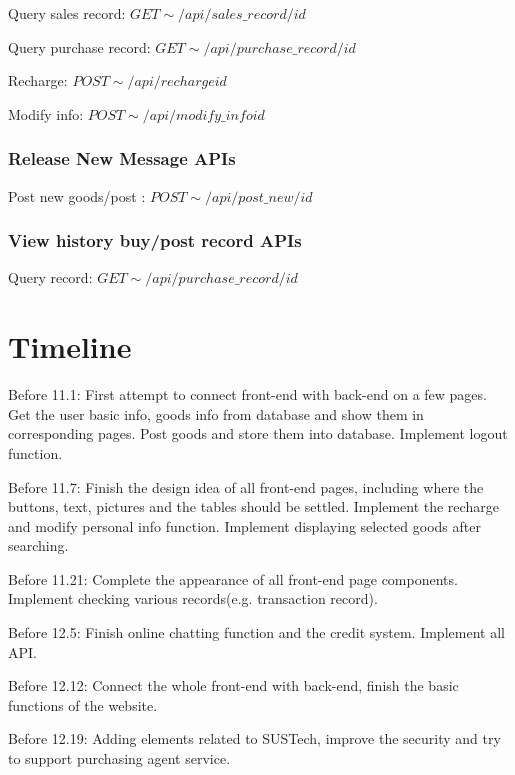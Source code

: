 \documentclass[12pt]{article}  %
\begin{document}
Query sales record: $GET\sim/api/sales\_record/{id}$

Query purchase record: $GET\sim/api/purchase\_record/{id}$

Recharge: $POST\sim/api/recharge{id}$

Modify info: $POST\sim/api/modify\_info{id}$

\vspace{-10pt}

\subsubsection*{Release New Message APIs}
Post new goods/post : $POST\sim/api/post\_new/{id}$

\vspace{-10pt}

\subsubsection*{View history buy/post record APIs}
Query record: $GET\sim/api/purchase\_record/{id}$


\section{Timeline}

Before 11.1: 
First attempt to connect front-end with 
back-end on a few pages. Get the user basic info, goods 
info from database and show them in corresponding pages. 
Post goods and store them into database. Implement 
logout function.

Before 11.7: 
Finish the design idea of all front-end pages, including 
where the buttons, text, pictures and the tables should 
be settled. Implement the recharge and modify 
personal info function. Implement displaying selected 
goods after searching. 

Before 11.21:
Complete the appearance of all front-end 
page components. Implement checking various 
records(e.g. transaction record).

Before 12.5:
Finish online chatting function and the credit system. 
Implement all API.

Before 12.12:
Connect the whole front-end with back-end, finish the 
basic functions of the website.

Before 12.19:
Adding elements related to SUSTech, improve the 
security and try to support purchasing agent service.
\end{document}
